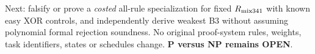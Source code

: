 \documentclass[11pt]{article}
\begin{document}
Next: falsify or prove a \emph{costed} all-rule specialization for fixed \(R_{\rm mix341}\) with known easy XOR controls, and independently derive weakest B3 without assuming polynomial formal rejection soundness. No original proof-system rules, weights, task identifiers, states or schedules change. \textbf{P versus NP remains OPEN}.
\end{document}
